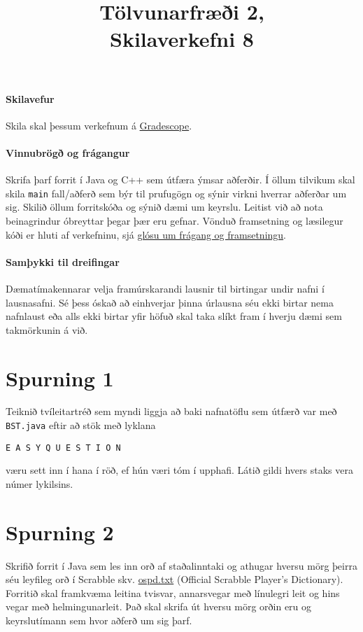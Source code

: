 \documentclass{article}
\title{Tölvunarfræði 2, \semester \\ Skilaverkefni 8}
\author{}
\begin{document}
\maketitle
{}

\paragraph{Skilavefur} Skila skal þessum verkefnum á \href{https://gradescope.com/courses/5640}{Gradescope}.

\paragraph{Vinnubrögð og frágangur} Skrifa þarf forrit í Java og C++ sem útfæra ýmsar aðferðir. Í öllum tilvikum skal skila \texttt{main} fall/aðferð sem býr til prufugögn og sýnir virkni hverrar aðferðar um sig. Skilið öllum forritskóða og sýnið dæmi um keyrslu. Leitist við að nota beinagrindur óbreyttar þegar þær eru gefnar. Vönduð framsetning og læsilegur kóði er hluti af verkefninu, sjá \href{https://piazza.com/class/ixkicfen49l111?cid=52}{glósu um frágang og framsetningu}.

\paragraph{Samþykki til dreifingar} Dæmatímakennarar velja framúrskarandi lausnir til birtingar undir nafni í lausnasafni. Sé þess óskað að einhverjar þinna úrlausna séu ekki birtar nema nafnlaust eða alls ekki birtar yfir höfuð skal taka slíkt fram í hverju dæmi sem takmörkunin á við.

\section{Spurning 1}
Teiknið tvíleitartréð sem myndi liggja að baki nafnatöflu sem útfærð var með \texttt{BST.java} eftir að stök með lyklana
\begin{center}
\texttt{E A S Y Q U E S T I O N} 
\end{center}
væru sett inn í hana í röð, ef hún væri tóm í upphafi. Látið gildi hvers staks vera númer lykilsins.

\section{Spurning 2}
Skrifið forrit í Java sem les inn orð af staðalinntaki og athugar hversu mörg þeirra séu leyfileg orð í Scrabble skv. \href{http://introcs.cs.princeton.edu/java/data/ospd.txt}{ospd.txt} (Official Scrabble Player's Dictionary). Forritið skal framkvæma leitina tvisvar, annarsvegar með línulegri leit og hins vegar með helmingunarleit. Það skal skrifa út hversu mörg orðin eru og keyrslutímann sem hvor aðferð um sig þarf.
\end{document}
